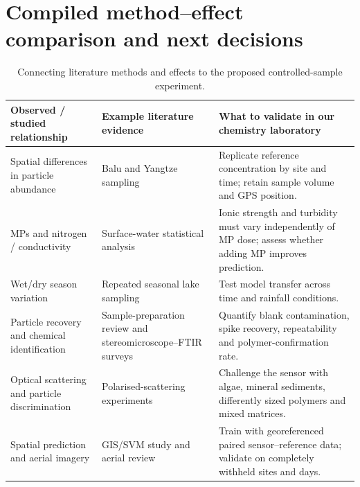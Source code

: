 \documentclass[10pt,a4paper]{article}
\begin{document}
\section{Compiled method--effect comparison and next decisions}
\begin{table}[H]\centering\footnotesize
\caption{Connecting literature methods and effects to the proposed controlled-sample experiment.}
\begin{tabularx}{\linewidth}{@{}p{3.0cm}XX@{}}\toprule
Observed / studied relationship & Example literature evidence & What to validate in our chemistry laboratory \\ \midrule
Spatial differences in particle abundance & Balu and Yangtze sampling \cite{MPWE00007,MPWE00013} & Replicate reference concentration by site and time; retain sample volume and GPS position. \\
MPs and nitrogen / conductivity & Surface-water statistical analysis \cite{MPWE00002} & Ionic strength and turbidity must vary independently of MP dose; assess whether adding MP improves prediction. \\
Wet/dry season variation & Repeated seasonal lake sampling \cite{MPWE00090} & Test model transfer across time and rainfall conditions. \\
Particle recovery and chemical identification & Sample-preparation review and stereomicroscope--FTIR surveys \cite{MPWE00061,MPWE00013,MPWE00012} & Quantify blank contamination, spike recovery, repeatability and polymer-confirmation rate. \\
Optical scattering and particle discrimination & Polarised-scattering experiments \cite{MPWE01416} & Challenge the sensor with algae, mineral sediments, differently sized polymers and mixed matrices. \\
Spatial prediction and aerial imagery & GIS/SVM study and aerial review \cite{MPWE02100,MPWE04211} & Train with georeferenced paired sensor--reference data; validate on completely withheld sites and days. \\
\bottomrule\end{tabularx}
\end{table}
\end{document}
